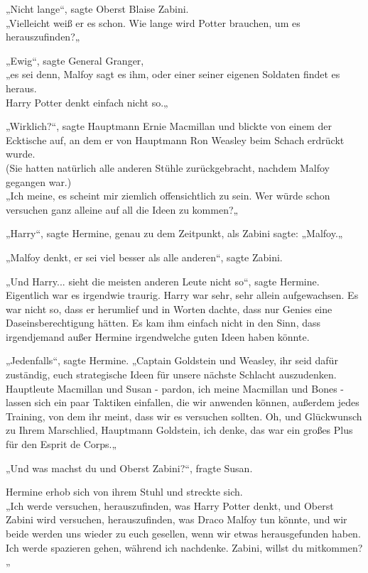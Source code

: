 {„Nicht lange“, sagte Oberst Blaise Zabini.\\ „Vielleicht weiß er es schon. Wie lange wird Potter brauchen, um es herauszufinden?„

„Ewig“, sagte General Granger,\\ „es sei denn, Malfoy sagt es ihm, oder einer seiner eigenen Soldaten findet es heraus.\\ Harry Potter denkt einfach nicht so.„

„Wirklich?“, sagte Hauptmann Ernie Macmillan und blickte von einem der Ecktische auf, an dem er von Hauptmann Ron Weasley beim Schach erdrückt wurde.\\ (Sie hatten natürlich alle anderen Stühle zurückgebracht, nachdem Malfoy gegangen war.)\\ „Ich meine, es scheint mir ziemlich offensichtlich zu sein. Wer würde schon versuchen ganz alleine auf all die Ideen zu kommen?„

„Harry“, sagte Hermine, genau zu dem Zeitpunkt, als Zabini sagte: „Malfoy.„

„Malfoy denkt, er sei viel besser als alle anderen“, sagte Zabini.

„Und Harry... sieht die meisten anderen Leute nicht so“, sagte Hermine. Eigentlich war es irgendwie traurig. Harry war sehr, sehr allein aufgewachsen. Es war nicht so, dass er herumlief und in Worten dachte, dass nur Genies eine Daseinsberechtigung hätten. Es kam ihm einfach nicht in den Sinn, dass irgendjemand außer Hermine irgendwelche guten Ideen haben könnte.

„Jedenfalls“, sagte Hermine. „Captain Goldstein und Weasley, ihr seid dafür zuständig, euch strategische Ideen für unsere nächste Schlacht auszudenken.\\ Hauptleute Macmillan und Susan - pardon, ich meine Macmillan und Bones - lassen sich ein paar Taktiken einfallen, die wir anwenden können, außerdem jedes Training, von dem ihr meint, dass wir es versuchen sollten. Oh, und Glückwunsch zu Ihrem Marschlied, Hauptmann Goldstein, ich denke, das war ein großes Plus für den Esprit de Corps.„

„Und was machst du und Oberst Zabini?“, fragte Susan.

Hermine erhob sich von ihrem Stuhl und streckte sich.\\ „Ich werde versuchen, herauszufinden, was Harry Potter denkt, und Oberst Zabini wird versuchen, herauszufinden, was Draco Malfoy tun könnte, und wir beide werden uns wieder zu euch gesellen, wenn wir etwas herausgefunden haben. Ich werde spazieren gehen, während ich nachdenke. Zabini, willst du mitkommen?„

}
